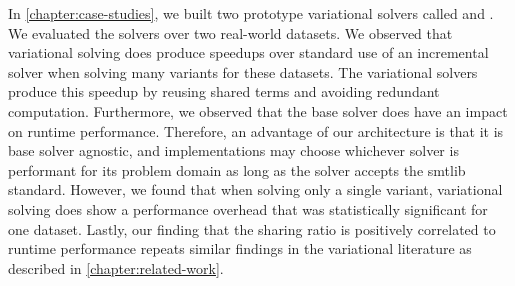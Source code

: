 In \autoref{chapter:case-studies}, we built two prototype variational solvers
called \vsat{} and \vsmt{}. We evaluated the solvers over two real-world
datasets. We observed that variational solving does produce speedups over
standard use of an incremental solver when solving many variants for these
datasets. The variational solvers produce this speedup by reusing shared terms
and avoiding redundant computation. Furthermore, we observed that the base
solver does have an impact on runtime performance. Therefore, an advantage of
our architecture is that it is base solver agnostic, and implementations may
choose whichever solver is performant for its problem domain as long as the
solver accepts the \acl{smtlib} standard. However, we found that when solving
only a single variant, variational solving does show a performance overhead that
was statistically significant for one dataset. Lastly, our finding that the
sharing ratio is positively correlated to runtime performance repeats similar
findings in the variational literature as described in
\autoref{chapter:related-work}.
